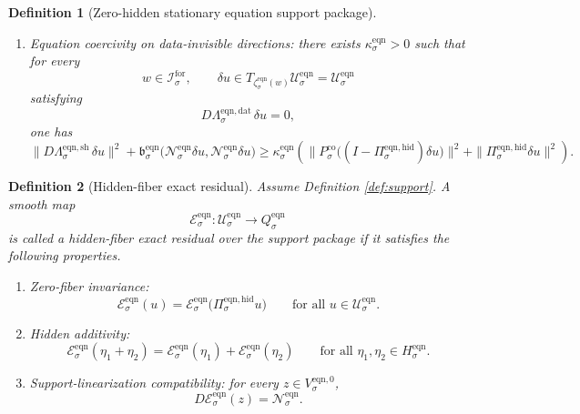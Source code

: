 \documentclass[11pt]{article}
\newcommand{\ForSpace}[1]{\mathcal I_{#1}^{\mathrm{for}}}
\newcommand{\Kernel}[1]{K_{#1}^{0}}
\newcommand{\StateComp}[1]{P_{#1}^{\mathrm{co}}}
\newcommand{\EqnSpace}[1]{\mathcal U_{#1}^{\mathrm{eqn}}}
\newcommand{\EqnData}[1]{\Lambda_{#1}^{\mathrm{eqn,dat}}}
\newcommand{\EqnShell}[1]{\Lambda_{#1}^{\mathrm{eqn,sh}}}
\newcommand{\EqnTarget}[1]{Q_{#1}^{\mathrm{eqn}}}
\newcommand{\EqnPair}[1]{\mathfrak b_{#1}^{\mathrm{eqn}}}
\newcommand{\EqnResidual}[1]{\mathcal E_{#1}^{\mathrm{eqn}}}
\newcommand{\EqnZero}[1]{V_{#1}^{\mathrm{eqn},0}}
\newcommand{\EqnHidden}[1]{H_{#1}^{\mathrm{eqn}}}
\newcommand{\EqnProj}[1]{\Pi_{#1}^{\mathrm{eqn,hid}}}
\newcommand{\EqnLin}[1]{\mathcal N_{#1}^{\mathrm{eqn}}}
\newcommand{\EqnEmbed}[1]{\zeta_{#1}^{\mathrm{eqn}}}
\newtheorem{definition}{Definition}
\begin{document}
\begin{definition}[Zero-hidden stationary equation support package]
\begin{enumerate}
    \[
    \Kernel{\sigma}
    \equiv
    \ker\bigl(D\EqnData{\sigma}\big|_{\EqnZero{\sigma}}\bigr)
    \cap
    \ker\bigl(D\EqnShell{\sigma}\big|_{\EqnZero{\sigma}}\bigr)
    \]
    and the orthogonal projector
    \[
    \StateComp{\sigma}:
    \EqnZero{\sigma}\to
    {\Kernel{\sigma}}^{\perp}\cap\EqnZero{\sigma}.
    \]
    \item Equation coercivity on data-invisible directions: there exists \(\kappa_{\sigma}^{\mathrm{eqn}}>0\) such that for every
    \[
    w\in\ForSpace{\sigma},
    \qquad
    \delta u\in T_{\EqnEmbed{\sigma}(w)}\EqnSpace{\sigma}=\EqnSpace{\sigma}
    \]
    satisfying
    \[
    D\EqnData{\sigma}\,\delta u=0,
    \]
    one has
    \begin{equation}
    \|D\EqnShell{\sigma}\,\delta u\|^{2}
    +
    \EqnPair{\sigma}\bigl(\EqnLin{\sigma}\delta u,\EqnLin{\sigma}\delta u\bigr)
    \ge
    \kappa_{\sigma}^{\mathrm{eqn}}
    \left(
    \|\StateComp{\sigma}\bigl((I-\EqnProj{\sigma})\delta u\bigr)\|^{2}
    +
    \|\EqnProj{\sigma}\delta u\|^{2}
    \right).
    \label{eq:supportcoercive}
    \end{equation}
\end{enumerate}
\end{definition}

\begin{definition}[Hidden-fiber exact residual]
\label{def:exact}
Assume Definition \ref{def:support}. A smooth map
\[
\EqnResidual{\sigma}:\EqnSpace{\sigma}\to\EqnTarget{\sigma}
\]
is called a \emph{hidden-fiber exact residual} over the support package if it satisfies the following properties.
\begin{enumerate}
    \item Zero-fiber invariance:
    \begin{equation}
    \EqnResidual{\sigma}(u)
    =
    \EqnResidual{\sigma}\bigl(\EqnProj{\sigma}u\bigr)
    \qquad
    \text{for all }u\in\EqnSpace{\sigma}.
    \label{eq:exactinvariant}
    \end{equation}
    \item Hidden additivity:
    \begin{equation}
    \EqnResidual{\sigma}(\eta_{1}+\eta_{2})
    =
    \EqnResidual{\sigma}(\eta_{1})
    +
    \EqnResidual{\sigma}(\eta_{2})
    \qquad
    \text{for all }\eta_{1},\eta_{2}\in\EqnHidden{\sigma}.
    \label{eq:exactadditive}
    \end{equation}
    \item Support-linearization compatibility: for every \(z\in\EqnZero{\sigma}\),
    \begin{equation}
    D\EqnResidual{\sigma}(z)=\EqnLin{\sigma}.
    \label{eq:exactlinearization}
    \end{equation}
\end{enumerate}
\end{definition}
\end{document}
